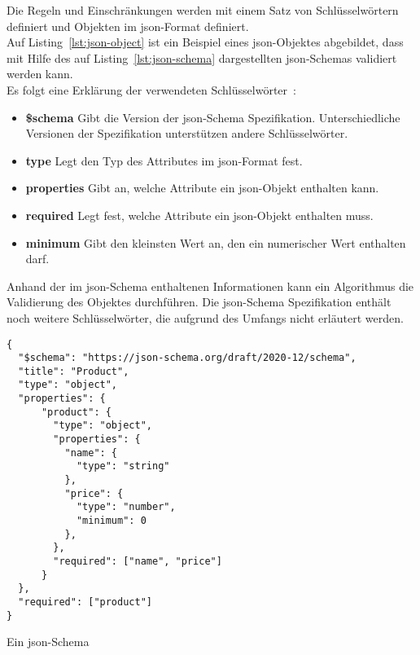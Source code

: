 Die Regeln und Einschränkungen werden mit einem Satz von Schlüsselwörtern definiert und Objekten im \acs{json}-Format definiert.
\\
Auf Listing~\ref{lst:json-object} ist ein Beispiel eines \acs{json}-Objektes abgebildet, dass mit Hilfe des auf Listing~\ref{lst:json-schema}
dargestellten \acs{json}-Schemas validiert werden kann.
\\
Es folgt eine Erklärung der verwendeten Schlüsselwörter~\cite{json-schema-creation}:

\begin{itemize}
      \setlength\itemsep{-0.5cm}
      \item
            \textbf{\$schema} Gibt die Version der \acs{json}-Schema Spezifikation. Unterschiedliche Versionen der Spezifikation
            unterstützen andere Schlüsselwörter.
      \item
            \textbf{type} Legt den Typ des Attributes im \acs{json}-Format fest.
      \item
            \textbf{properties} Gibt an, welche Attribute ein \acs{json}-Objekt enthalten kann.
      \item
            \textbf{required} Legt fest, welche Attribute ein \acs{json}-Objekt enthalten muss.
      \item
            \textbf{minimum} Gibt den kleinsten Wert an, den ein numerischer Wert enthalten darf.
\end{itemize}

Anhand der im \acs{json}-Schema enthaltenen Informationen kann ein Algorithmus die Validierung des Objektes durchführen.
Die \acs{json}-Schema Spezifikation enthält noch weitere Schlüsselwörter, die aufgrund des Umfangs nicht erläutert werden.
\newpage
\begin{listing}[htp]
      \begin{verbatim}
{
  "$schema": "https://json-schema.org/draft/2020-12/schema",
  "title": "Product",
  "type": "object",
  "properties": {
      "product": {
        "type": "object",
        "properties": {
          "name": {
            "type": "string"
          },
          "price": {
            "type": "number", 
            "minimum": 0
          },
        },
        "required": ["name", "price"]
      }
  },
  "required": ["product"]
}
      \end{verbatim}
      \caption{Ein \acs{json}-Schema}
      \label{lst:json-schema}
\end{listing}